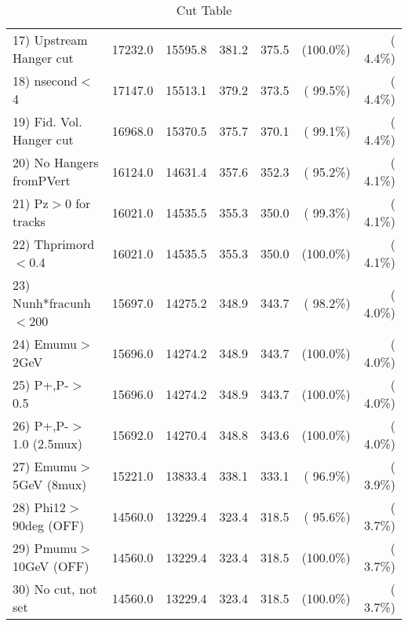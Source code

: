 \begin{table}[h!]
\begin{tabular}{||l||r|r|r|r|r|r||}
 17) Upstream Hanger cut  &      17232.0 &      15595.8 &        381.2 &        375.5 & (100.0\%) & (  4.4\%) \\
 18) nsecond$<$4          &      17147.0 &      15513.1 &        379.2 &        373.5 & ( 99.5\%) & (  4.4\%) \\
 19) Fid. Vol. Hanger cut &      16968.0 &      15370.5 &        375.7 &        370.1 & ( 99.1\%) & (  4.4\%) \\
 20) No Hangers fromPVert &      16124.0 &      14631.4 &        357.6 &        352.3 & ( 95.2\%) & (  4.1\%) \\
 21) Pz$>$0 for tracks    &      16021.0 &      14535.5 &        355.3 &        350.0 & ( 99.3\%) & (  4.1\%) \\
 22) Thprimord$<$0.4      &      16021.0 &      14535.5 &        355.3 &        350.0 & (100.0\%) & (  4.1\%) \\
 23) Nunh*fracunh$<$200   &      15697.0 &      14275.2 &        348.9 &        343.7 & ( 98.2\%) & (  4.0\%) \\
 24) Emumu$>$2GeV         &      15696.0 &      14274.2 &        348.9 &        343.7 & (100.0\%) & (  4.0\%) \\
 25) P+,P-$>$0.5          &      15696.0 &      14274.2 &        348.9 &        343.7 & (100.0\%) & (  4.0\%) \\
 26) P+,P-$>$1.0 (2.5mux) &      15692.0 &      14270.4 &        348.8 &        343.6 & (100.0\%) & (  4.0\%) \\
 27) Emumu$>$5GeV  (8mux) &      15221.0 &      13833.4 &        338.1 &        333.1 & ( 96.9\%) & (  3.9\%) \\
 28) Phi12$>$90deg  (OFF) &      14560.0 &      13229.4 &        323.4 &        318.5 & ( 95.6\%) & (  3.7\%) \\
 29) Pmumu$>$10GeV  (OFF) &      14560.0 &      13229.4 &        323.4 &        318.5 & (100.0\%) & (  3.7\%) \\
 30) No cut, not set      &      14560.0 &      13229.4 &        323.4 &        318.5 & (100.0\%) & (  3.7\%) \\
 \hline
 \hline
 \end{tabular}
 \caption{Cut Table           }
 \label{tab-cutcohjpsi-mumu_cohpip}
 \end{table}
